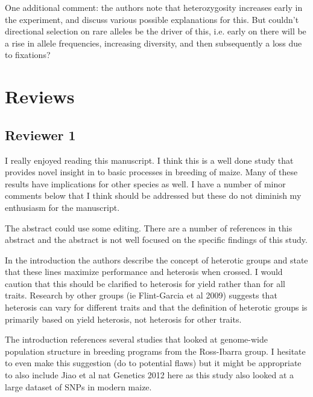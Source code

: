 \documentclass[onecolumn,oneside,letterpaper]{article}
\begin{document}
One additional comment: the authors note that heterozygosity increases early in the experiment, and discuss various possible explanations for this. But couldn't directional selection on rare alleles be the driver of this, i.e. early on there will be a rise in allele frequencies, increasing diversity, and then subsequently a loss due to fixations?


\section*{Reviews}
\subsection{Reviewer 1}
I really enjoyed reading this manuscript.  I think this is a well done study 
that provides novel insight in to basic processes in breeding of maize.  Many of 
these results have implications for other species as well.  I have a number of 
minor comments below that I think should be addressed but these do not diminish 
my enthusiasm for the manuscript.

The abstract could use some editing.  There are a number of references in this 
abstract and the abstract is not well focused on the specific findings of this 
study.  


In the introduction the authors describe the concept of heterotic groups and state that these lines maximize performance and heterosis when crossed.  I would caution that this should be clarified to heterosis for yield rather than for all traits. Research by other groups (ie Flint-Garcia et al 2009) suggests that heterosis can vary for different traits and that the definition of heterotic groups is primarily based on yield heterosis, not heterosis for other traits.  


The introduction references several studies that looked at genome-wide 
population structure in breeding programs from the Ross-Ibarra group.  I 
hesitate to even make this suggestion (do to potential flaws) but it might be appropriate to also include Jiao et al nat Genetics 2012 here as this study also looked at a large dataset of SNPs in modern maize. 
\end{document}
